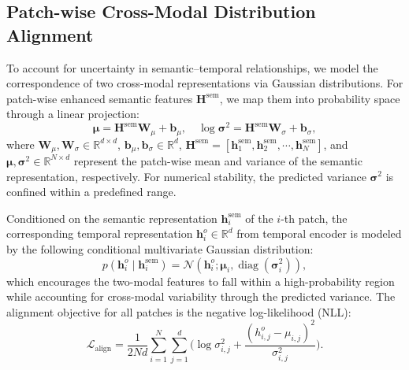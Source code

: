 \documentclass[letterpaper]{article} %
\begin{document}
\subsection{Patch-wise Cross-Modal Distribution Alignment}
To account for uncertainty in semantic--temporal relationships, 
we model the correspondence of two cross-modal representations via Gaussian distributions. For patch-wise enhanced semantic features $\mathbf{H}^{\mathrm{sem}}$, we map them into probability space through a linear projection:
\begin{equation}
\boldsymbol{\mu}
=\mathbf{H}^{\mathrm{sem}}\mathbf{W}_{\mu}+\mathbf{b}_{\mu},
\quad
\log\boldsymbol{\sigma}^{2}
=\mathbf{H}^{\mathrm{sem}}\mathbf{W}_{\sigma}+\mathbf{b}_{\sigma},
\label{eq:distribution_parameters}
\end{equation}
where $\mathbf{W}_{\mu}, \mathbf{W}_{\sigma} \in \mathbb{R}^{d \times d}$, $\mathbf{b}_{\mu}, \mathbf{b}_{\sigma} \in \mathbb{R}^{d}$, $\mathbf{H}^{\mathrm{sem}} = [\mathbf{h}^{\mathrm{sem}}_1, \mathbf{h}^{\mathrm{sem}}_2, \cdots, \mathbf{h}^{\mathrm{sem}}_N]$, and $\boldsymbol{\mu}, \boldsymbol{\sigma}^2 \in
\mathbb{R}^{N \times d}$ represent the patch-wise mean and variance of the semantic representation, respectively.
For numerical stability, the predicted variance
$\boldsymbol{\sigma}^{2}$ is confined within a predefined range.

Conditioned on the semantic representation $\mathbf{h}^{\mathrm{sem}}_{i}$ of the $i$-th patch, the corresponding temporal representation $\mathbf{h}_i^o \in \mathbb{R}^d$ from temporal encoder is modeled by the following conditional multivariate Gaussian distribution:
\begin{equation}
    p
    \left(
    \mathbf{h}^{o}_{i}
    \mid
    \mathbf{h}^{\mathrm{sem}}_{i}
    \right)
    =
    \mathcal{N}
    \left(
    \mathbf{h}^{o}_{i};
    \boldsymbol{\mu}_{i},
    \operatorname{diag}
    \left(
    \boldsymbol{\sigma}_{i}^2
    \right)
    \right),
\end{equation}
which encourages the two-modal features to fall within a high-probability region while accounting for cross-modal variability through the predicted variance. The alignment objective for all patches is the negative log-likelihood (NLL):
\begin{equation}
    \mathcal{L}_{\mathrm{align}}
    =
    \frac{1}{2Nd}
    \sum_{i=1}^{N}
    \sum_{j=1}^{d}
    \Big(
    \log\sigma_{i,j}^2
    +\frac{(h^{o}_{i,j}-\mu_{i,j})^2}
    {\sigma_{i,j}^2}
    \Big).
\end{equation}
\end{document}
